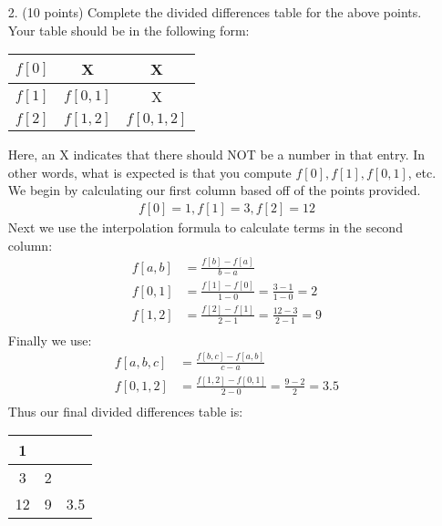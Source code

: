 \documentclass{article}
\begin{document}
\begin{enumerate}
    \newpage
    \item[2.] (10 points) Complete the divided differences table for the above points. Your table should be in the following form:\newline\newline
    \begin{tabular}{ c|c|c } 
        $f[0]$ & X & X \\
        \hline
        $f[1]$ & $f[0, 1]$ & X \\
        \hline
        $f[2]$ & $f[1, 2]$ & $f[0, 1, 2]$ \\ 
    \end{tabular}\newline\newline
    Here, an X indicates that there should NOT be a number in that entry.
    \newline
    \newline
    In other words, what is expected is that you compute $f[0], f[1], f[0, 1]$, etc.
    We begin by calculating our first column based off of the points provided.
    \begin{align*}
        f[0] = 1,  f[1] = 3, f[2] = 12
    \end{align*}
    Next we use the interpolation formula to calculate terms in the second column:
    \begin{align*}
        f[a, b] &= \frac{f[b]-f[a]}{b-a}\\
        f[0, 1] &= \frac{f[1]-f[0]}{1-0} = \frac{3-1}{1-0} = 2\\
        f[1, 2] &= \frac{f[2]-f[1]}{2-1} = \frac{12-3}{2-1} = 9\\
    \end{align*}
    Finally we use:
    \begin{align*}
        f[a, b, c] &= \frac{f[b, c]-f[a, b]}{c-a}\\
        f[0, 1, 2] &= \frac{f[1, 2]-f[0, 1]}{2-0} = \frac{9-2}{2} = 3.5\\
    \end{align*}
    Thus our final divided differences table is:
      \begin{center}
        \begin{tabular}{ c|c|c } 
             1 &  &  \\ 
             \hline
             3 & 2 &  \\
             \hline
             12 & 9 & 3.5\\ 
        \end{tabular}
    \end{center}
    

\end{enumerate}
\end{document}
